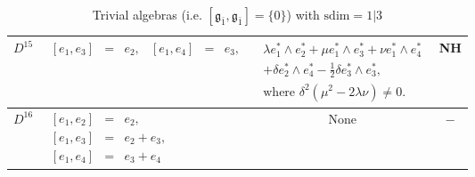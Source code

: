 \documentclass[12pt]{amsart}
\begin{document}
\begin{table}[H]
\begin{tabular}{| c | l | c |c|}
$D^{15}$ & $
\begin{array}{lcrlcl}
[e_1, e_3]&=&e_2 ,& [e_1, e_4]&=&e_3,
\end{array}$ & 
$\begin{array}{l}
\lambda e_1^*\wedge e_2^*+\mu e_1^*\wedge e_3^*+ \nu e_1^*\wedge e_4^* \\[1mm]
+ \delta e_2^*\wedge e_4^* -\frac{1}{2} \delta e_3^*\wedge e_3^*,\\[1mm]
\text{where } \delta^2(\mu^2-2 \lambda  \nu)\not =0.
\end{array}$ & NH\\ \hline
$D^{16}$ & $
\begin{array}{lcl}
[e_1, e_2]&=&e_2 ,\\[1mm]
 [e_1, e_3]&=&e_2+e_3,\\[1mm]
 [e_1, e_4]&=&e_3+e_4
\end{array}$ & None & $-$\\ \hline
\end{tabular}
\caption{Trivial algebras (i.e. $[\mathfrak{g}_{\bar 1}, \mathfrak{g}_{\bar 1}]=\{0\}$) with $\mathrm{sdim}=1|3$}\label{tab4}
\end{table}



\footnotesize
\end{document}
